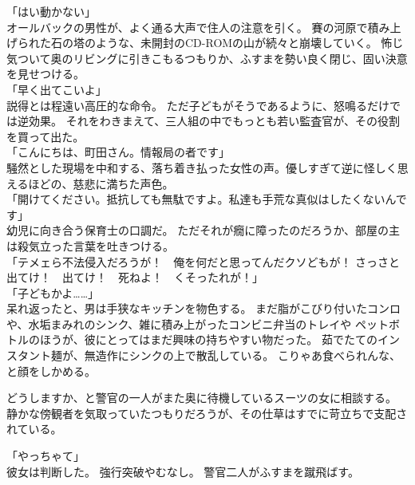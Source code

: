 \documentclass[../NenokuniMain]{subfiles}
\begin{document}
「はい動かない」\\
オールバックの男性が、よく通る大声で住人の注意を引く。
賽の河原で積み上げられた石の塔のような、未開封のCD-ROMの山が続々と崩壊していく。
怖じ気ついて奥のリビングに引きこもるつもりか、ふすまを勢い良く閉じ、固い決意を見せつける。\\
「早く出てこいよ」\\
説得とは程遠い高圧的な命令。
ただ子どもがそうであるように、怒鳴るだけでは逆効果。
それをわきまえて、三人組の中でもっとも若い監査官が、その役割を買って出た。\\
「こんにちは、町田さん。情報局の者です」\\
騒然とした現場を中和する、落ち着き払った女性の声。優しすぎて逆に怪しく思えるほどの、慈悲に満ちた声色。\\
「開けてください。抵抗しても無駄ですよ。私達も手荒な真似はしたくないんです」\\
幼児に向き合う保育士の口調だ。
ただそれが癇に障ったのだろうか、部屋の主は殺気立った言葉を吐きつける。\\
「テメェら不法侵入だろうが！　俺を何だと思ってんだクソどもが！
さっさと出てけ！　出てけ！　死ねよ！　くそったれが！」\\
「子どもかよ……」\\
呆れ返ったと、男は手狭なキッチンを物色する。
まだ脂がこびり付いたコンロや、水垢まみれのシンク、雑に積み上がったコンビニ弁当のトレイや
ペットボトルのほうが、彼にとってはまだ興味の持ちやすい物だった。
茹でたてのインスタント麺が、無造作にシンクの上で散乱している。
こりゃあ食べられんな、と顔をしかめる。

どうしますか、と警官の一人がまた奥に待機しているスーツの女に相談する。
静かな傍観者を気取っていたつもりだろうが、その仕草はすでに苛立ちで支配されている。

「やっちゃて」\\
彼女は判断した。
強行突破やむなし。
警官二人がふすまを蹴飛ばす。
\end{document}
